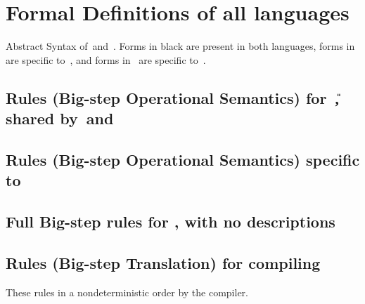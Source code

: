\documentclass[manuscript,screen, 12pt, nonacm]{acmart}
\begin{document}
\section{Formal Definitions of all languages}
\label{languagedefs}

\begin{table}[H]
  \utable
  \caption{Abstract Syntax of~\VMinus and~\D. Forms in black are present in both
              languages, forms in~ are specific to~\VMinus, and forms
              in~ are specific to~\D.}
  \label{fig:unilang2}
\end{table}

\subsection{Rules (Big-step Operational Semantics) for~\U, shared by~\VMinus and~\D}
\label{usemantics1}
\usemantics 
\subsection{Rules (Big-step Operational Semantics) specific to~\VMinus}
\label{vmsemantics2}
\vmsemantics
\label{dsemantics2}
\dsemantics

\subsection{Full Big-step rules for \Compile, with no descriptions}



\subsection{Rules (Big-step Translation) for compiling \iffibf}

These rules in a nondeterministic order by the compiler. 

\rawcompiler
\end{document}

